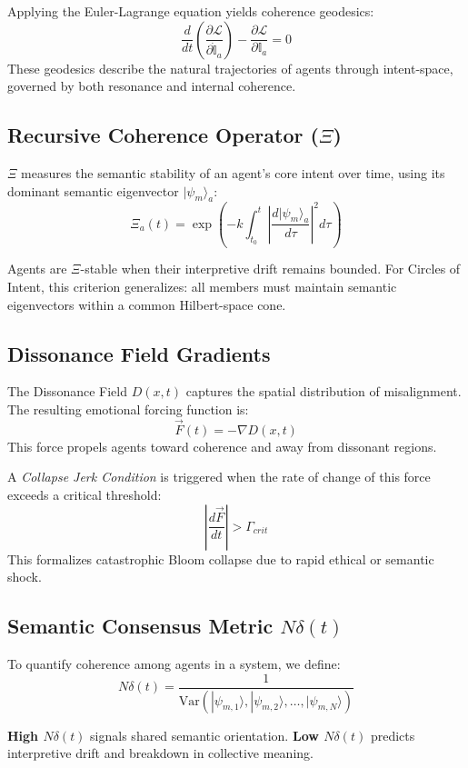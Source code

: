 \documentclass[12pt]{article}
\begin{document}
Applying the Euler-Lagrange equation yields coherence geodesics:
\[
\frac{d}{dt} \left( \frac{\partial \mathcal{L}}{\partial \dot{\mathbb{I}}_a} \right) - \frac{\partial \mathcal{L}}{\partial \mathbb{I}_a} = 0
\]
These geodesics describe the natural trajectories of agents through intent-space, governed by both resonance and internal coherence.

\subsection{Recursive Coherence Operator (\(\Xi\))}

\(\Xi\) measures the semantic stability of an agent’s core intent over time, using its dominant semantic eigenvector \(|\psi_m\rangle_a\):
\[
\Xi_a(t) = \exp\left( -k \int_{t_0}^{t} \left| \frac{d|\psi_m\rangle_a}{d\tau} \right|^2 d\tau \right)
\]

Agents are \(\Xi\)-stable when their interpretive drift remains bounded. For Circles of Intent, this criterion generalizes: all members must maintain semantic eigenvectors within a common Hilbert-space cone.

\subsection{Dissonance Field Gradients}

The Dissonance Field \(D(x,t)\) captures the spatial distribution of misalignment. The resulting emotional forcing function is:
\[
\vec{F}(t) = -\nabla D(x,t)
\]
This force propels agents toward coherence and away from dissonant regions.

A \emph{Collapse Jerk Condition} is triggered when the rate of change of this force exceeds a critical threshold:
\[
\left| \frac{d\vec{F}}{dt} \right| > \Gamma_{crit}
\]
This formalizes catastrophic Bloom collapse due to rapid ethical or semantic shock.

\subsection{Semantic Consensus Metric \(N\delta(t)\)}

To quantify coherence among agents in a system, we define:
\[
N\delta(t) = \frac{1}{\text{Var}(|\psi_{m,1}\rangle, |\psi_{m,2}\rangle, \dots, |\psi_{m,N}\rangle)}
\]

\textbf{High \(N\delta(t)\)} signals shared semantic orientation. \textbf{Low \(N\delta(t)\)} predicts interpretive drift and breakdown in collective meaning.
\end{document}
